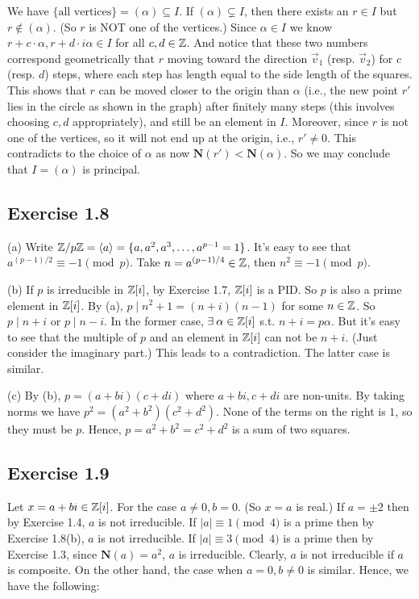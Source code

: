 \documentclass[../Marcus.tex]{subfiles}
\begin{document}
We have $\{\text{all vertices}\}=(\alpha)\subseteq I$. If $(\alpha)\varsubsetneq I$, then there exists an $r\in I$ but $r\notin(\alpha)$. (So $r$ is NOT one of the vertices.) Since $\alpha\in I$ we know $r+c\cdot\alpha,r+d\cdot i\alpha\in I$ for all $c,d\in\mathbb{Z}$. And notice that these two numbers correspond geometrically that $r$ moving toward the direction $\vec v_1$ (resp. $\vec v_2$) for $c$ (resp. $d$) steps, where each step has length equal to the side length of the squares. This shows that $r$ can be moved closer to the origin than $\alpha$ (i.e., the new point $r'$ lies in the circle as shown in the graph) after finitely many steps (this involves choosing $c,d$ appropriately), and still be an element in $I$. Moreover, since $r$ is not one of the vertices, so it will not end up at the origin, i.e., $r'\neq0$. This contradicts to the choice of $\alpha$ as now $\mathbf{N}(r')<\mathbf{N}(\alpha)$. So we may conclude that $I=(\alpha)$ is principal.
 
\subsection*{Exercise 1.8}

(a) Write $\mathbb{Z}/p\mathbb{Z}=\langle a \rangle=\{a,a^2,a^3,\ldots,a^{p-1}=1\}$. It's easy to see that $a^{(p-1)/2}\equiv -1 \pmod{p}$. Take $n=a^{(p-1)/4}\in\mathbb{Z}$, then $n^2\equiv -1\pmod{p}$.

(b) If $p$ is irreducible in $\mathbb{Z}[i]$, by Exercise 1.7, $\mathbb{Z}[i]$ is a PID. So $p$ is also a prime element in $\mathbb{Z}[i]$. By (a), $p\mid n^2+1=(n+i)(n-1)$ for some $n\in\mathbb{Z}$. So $p\mid n+i$ or $p\mid n-i$. In the former case, $\exists \alpha\in\ZZ[i]$ s.t. $n+i=p\alpha$. But it's easy to see that the multiple of $p$ and an element in $\mathbb{Z}[i]$ can not be $n+i$. (Just consider the imaginary part.) This leads to a contradiction. The latter case is similar.

(c) By (b), $p=(a+bi)(c+di)$ where $a+bi,c+di$ are non-units. By taking norms we have $p^2=(a^2+b^2)(c^2+d^2)$. None of the terms on the right is $1$, so they must be $p$. Hence, $p=a^2+b^2=c^2+d^2$ is a sum of two squares.

\subsection*{Exercise 1.9}

Let $x=a+bi\in\mathbb{Z}[i]$. For the case $a\neq 0,b=0$. (So $x=a$ is real.) If $a=\pm2$ then by Exercise 1.4, $a$ is not irreducible. If $|a|\equiv 1\pmod{4}$ is a prime then by Exercise 1.8(b), $a$ is not irreducible. If $|a|\equiv 3\pmod{4}$ is a prime then by Exercise 1.3, since $\mathbf{N}(a)=a^2$, $a$ is irreducible. Clearly, $a$ is not irreducible if $a$ is composite. On the other hand, the case when $a=0,b\neq 0$ is similar. Hence, we have the following:
\end{document}
